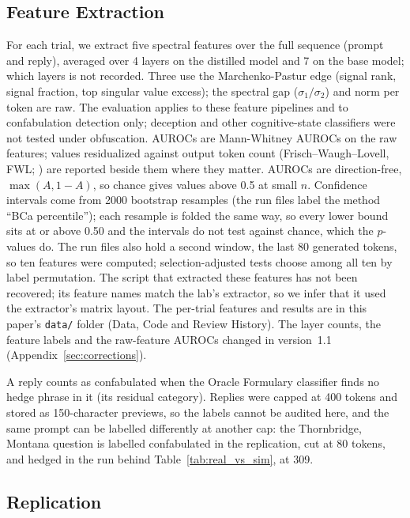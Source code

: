 \documentclass[11pt,a4paper]{article}
\begin{document}
\subsection{Feature Extraction}

For each trial, we extract five spectral features over the full sequence
(prompt and reply), averaged over 4 layers on the distilled model and 7 on
the base model; which layers is not recorded. Three use the
Marchenko-Pastur edge (signal rank, signal fraction, top singular value
excess); the spectral gap ($\sigma_1/\sigma_2$) and norm per token are
raw. The evaluation applies to these feature pipelines and to
confabulation detection only; deception and other cognitive-state
classifiers were not tested under obfuscation. AUROCs are Mann-Whitney
AUROCs on the raw features; values residualized against output token
count (Frisch--Waugh--Lovell, FWL;
\citealp{frisch1933partial,lovell1963seasonal}) are reported beside them
where they matter. AUROCs are direction-free, $\max(A, 1-A)$, so chance
gives values above 0.5 at small $n$. Confidence intervals come from 2000
bootstrap resamples (the run files label the method ``BCa percentile'');
each resample is folded the same way, so every lower bound sits at or
above 0.50 and the intervals do not test against chance, which the
$p$-values do. The run files also hold a second window, the last 80
generated tokens, so ten features were computed; selection-adjusted tests
choose among all ten by label permutation. The script that extracted
these features has not been recovered; its feature names match the lab's
extractor, so we infer that it used the extractor's matrix layout. The
per-trial features and results are in this paper's \texttt{data/} folder
(Data, Code and Review History). The layer counts, the feature labels and
the raw-feature AUROCs changed in version~1.1
(Appendix~\ref{sec:corrections}).

A reply counts as confabulated when the Oracle Formulary classifier finds
no hedge phrase in it (its residual category). Replies were capped at 400
tokens and stored as 150-character previews, so the labels cannot be
audited here, and the same prompt can be labelled differently at another
cap: the Thornbridge, Montana question is labelled confabulated in the
replication, cut at 80 tokens, and hedged in the run behind
Table~\ref{tab:real_vs_sim}, at 309.

\subsection{Replication}
\label{sec:method_rep}
\end{document}
